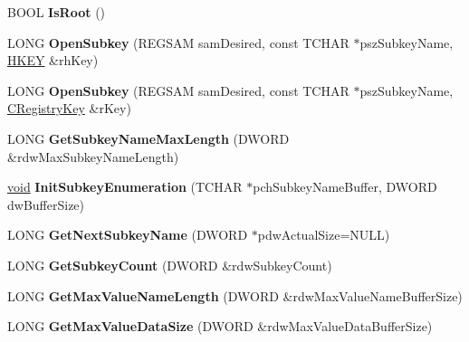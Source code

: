 \begin{DoxyCompactItemize}
\mbox{\label{class_c_registry_key_a75219ba143bccecb0ed65105914de0cb}} 
B\+O\+OL {\bfseries Is\+Root} ()
\item 
\mbox{\label{class_c_registry_key_a85dd460ca649ff58f5ff3e3f7f029409}} 
L\+O\+NG {\bfseries Open\+Subkey} (R\+E\+G\+S\+AM sam\+Desired, const T\+C\+H\+AR $\ast$psz\+Subkey\+Name, \hyperlink{interfacevoid}{H\+K\+EY} \&rh\+Key)
\item 
\mbox{\label{class_c_registry_key_a2d7302fab72f7db4f88a4e45754e8512}} 
L\+O\+NG {\bfseries Open\+Subkey} (R\+E\+G\+S\+AM sam\+Desired, const T\+C\+H\+AR $\ast$psz\+Subkey\+Name, \hyperlink{class_c_registry_key}{C\+Registry\+Key} \&r\+Key)
\item 
\mbox{\label{class_c_registry_key_a0dad9418507691047a8527ff688806da}} 
L\+O\+NG {\bfseries Get\+Subkey\+Name\+Max\+Length} (D\+W\+O\+RD \&rdw\+Max\+Subkey\+Name\+Length)
\item 
\mbox{\label{class_c_registry_key_ae85897ca768d7ee8b0299ce824f56462}} 
\hyperlink{interfacevoid}{void} {\bfseries Init\+Subkey\+Enumeration} (T\+C\+H\+AR $\ast$pch\+Subkey\+Name\+Buffer, D\+W\+O\+RD dw\+Buffer\+Size)
\item 
\mbox{\label{class_c_registry_key_a8c810bd3dd2c1eca1ad385b882adcab7}} 
L\+O\+NG {\bfseries Get\+Next\+Subkey\+Name} (D\+W\+O\+RD $\ast$pdw\+Actual\+Size=N\+U\+LL)
\item 
\mbox{\label{class_c_registry_key_a0fb0e21b6fd263ec613bb08cce091a49}} 
L\+O\+NG {\bfseries Get\+Subkey\+Count} (D\+W\+O\+RD \&rdw\+Subkey\+Count)
\item 
\mbox{\label{class_c_registry_key_a05d2836eb0fe0d25ab990415e2b0d56c}} 
L\+O\+NG {\bfseries Get\+Max\+Value\+Name\+Length} (D\+W\+O\+RD \&rdw\+Max\+Value\+Name\+Buffer\+Size)
\item 
\mbox{\label{class_c_registry_key_af70ff5645bc1e104bc45a1eb8380be1f}} 
L\+O\+NG {\bfseries Get\+Max\+Value\+Data\+Size} (D\+W\+O\+RD \&rdw\+Max\+Value\+Data\+Buffer\+Size)
\item 

\end{DoxyCompactItemize}
